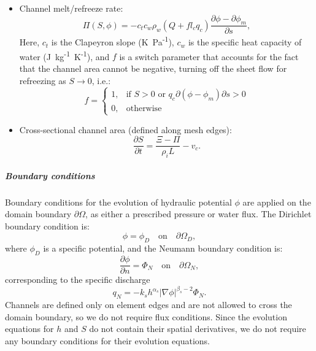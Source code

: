 \begin{itemize}
	\item Channel melt/refreeze rate:
	\begin{equation}
		\Pi(S,\phi)=-c_tc_w\rho_w(Q+f l_c q_c)\frac{\partial\phi-\partial\phi_m}{\partial s},
	\end{equation}
	Here, $c_t$ is the Clapeyron slope (K~Pa\textsuperscript{-1}), $c_w$ is the specific heat capacity of water (J~kg\textsuperscript{-1}~K\textsuperscript{-1}), and $f$ is a switch parameter that accounts for the fact that the channel area cannot be negative, turning off the sheet flow for refreezing as $S\rightarrow0$, i.e.:
	\begin{equation}
		f = 
		\left\{
		\begin{array}{ll}
			1, & \text{if }S>0 \text{ or } q_c\partial(\phi-\phi_m)\partial s>0\\
			0, & \text{otherwise}
		\end{array}\right.
	\end{equation}
\end{itemize}

\begin{itemize}
	\item Cross-sectional channel area (defined along mesh edges):
	\begin{equation}
		\frac{\partial S}{\partial t} = \frac{\Xi - \Pi}{\rho_i L} - v_c.
	\end{equation}
\end{itemize}

\subparagraph{Boundary conditions}
Boundary conditions for the evolution of hydraulic potential $\phi$ are applied on the domain boundary $\partial\Omega$, as either a prescribed pressure or water flux. The Dirichlet boundary condition is:
\begin{equation}
	\phi=\phi_D  \quad\text{on} \quad\partial\Omega_D,
\end{equation}
where $\phi_D$ is a specific potential, and the Neumann boundary condition is:
\begin{equation}
	\frac{\partial\phi}{\partial n}=\Phi_N  \quad\text{on} \quad\partial\Omega_N,
\end{equation}
corresponding to the specific discharge
\begin{equation}
	q_N=-k_s h^{\alpha_s}|\nabla\phi|^{\beta_s-2}\Phi_N.
\end{equation}
Channels are defined only on element edges and are not allowed to cross the domain boundary, so we do not require flux conditions. Since the evolution equations for $h$ and $S$ do not contain their spatial derivatives, we do not require any boundary conditions for their evolution equations.

